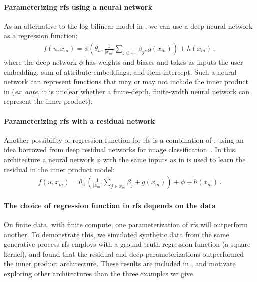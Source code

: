 \paragraph{Parameterizing \gls{rfs} using a neural network} As an alternative to
the log-bilinear model in , we can use a deep neural
network as a regression function:
\begin{align}
  f\left(u, x_m\right) = \phi\left(\theta_u, \frac{1}{|x_m|}\sum_{j\in x_m}
  \beta_j, g(x_m)\right) + h(x_m) \, ,
  \label{eqn:neural-network}
\end{align}
where the deep network $\phi$ has weights and biases and takes as inputs the
user embedding, sum of attribute embeddings, and item intercept. Such a neural
network can represent functions that may or may not include the inner product in
 (\emph{ex~ante}, it is unclear whether a finite-depth,
finite-width neural network can represent the inner product).


\paragraph{Parameterizing \gls{rfs} with a residual network} Another possibility
of regression function for \gls{rfs} is a combination of
, using an idea borrowed from deep
residual networks for image classification~\citep{he2015deep}. In this
architecture a neural network $\phi$ with the same inputs as in
 is used to learn the residual in the inner product
model:
\begin{align}
  f\left(u, x_m\right) = \theta_u^\top\left(\frac{1}{|x_m|}\sum_{j\in x_m}
  \beta_j + g(x_m)\right) + \phi + h(x_m) \, .
  \label{eqn:residual}
\end{align}

\paragraph{The choice of regression function in \gls{rfs} depends on the data}
On finite data, with finite compute, one parameterization of \gls{rfs} will
outperform another. To demonstrate this, we simulated synthetic data from the
same generative process \gls{rfs} employs with a ground-truth regression
function (a square kernel), and found that the residual and deep
parameterizations outperformed the inner product architecture. These results are
included in , and motivate exploring other architectures
than the three examples we give.


